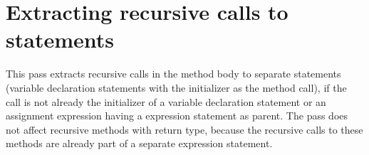 \section{Extracting recursive calls to statements}

This pass extracts recursive calls in the method body to separate statements (variable declaration statements with the
initializer as the method call), if the call is not already the initializer of a variable declaration statement or
an assignment expression having a expression statement as parent. The pass does not affect recursive methods with
 return type, because the recursive calls to these methods are already part of a separate expression
statement.